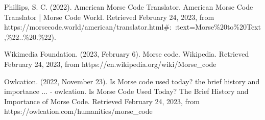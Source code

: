 \documentclass[12pt]{article}
\begin{document}
	Phillips, S. C. (2022). American Morse Code Translator. American Morse Code Translator | Morse Code World. Retrieved February 24, 2023, from https://morsecode.world/american/translator.html\#:~:text=Morse\%20to\%20Text,\%22..\%20.\%22). \newline
	
	Wikimedia Foundation. (2023, February 6). Morse code. Wikipedia. Retrieved February 24, 2023, from https://en.wikipedia.org/wiki/Morse\_code \newline 
	
	Owlcation. (2022, November 23). Is Morse code used today? the brief history and importance ... - owlcation. Is Morse Code Used Today? The Brief History and Importance of Morse Code. Retrieved February 24, 2023, from https://owlcation.com/humanities/morse\_code
	\printbibliography
	
\end{document}
